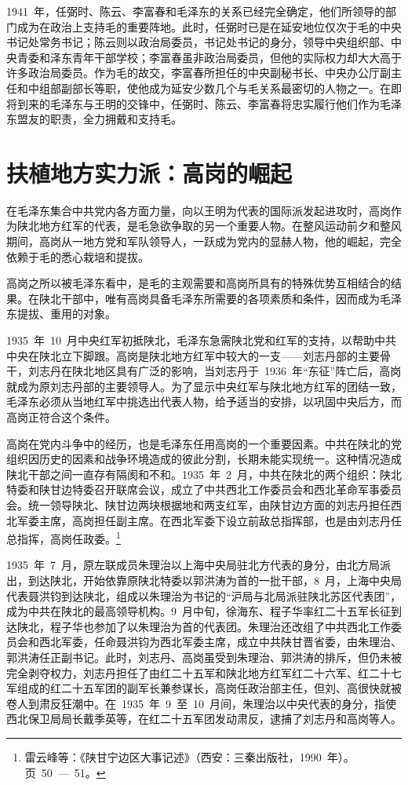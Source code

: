 1941~年，任弼时、陈云、李富春和毛泽东的关系已经完全确定，他们所领导的部门成为在政治上支持毛的重要阵地。此时，任弼时已是在延安地位仅次于毛的中央书记处常务书记；陈云则以政治局委员，书记处书记的身分，领导中央组织部、中央青委和泽东青年干部学校；李富春虽非政治局委员，但他的实际权力却大大高于许多政治局委员。作为毛的故交，李富春所担任的中央副秘书长、中央办公厅副主任和中组部副部长等职，使他成为延安少数几个与毛关系最密切的人物之一。在即将到来的毛泽东与王明的交锋中，任弼时、陈云、李富春将忠实履行他们作为毛泽东盟友的职责，全力拥戴和支持毛。

\section{扶植地方实力派：高岗的崛起}

在毛泽东集合中共党内各方面力量，向以王明为代表的国际派发起进攻时，高岗作为陕北地方红军的代表，是毛急欲争取的另一个重要人物。在整风运动前夕和整风期间，高岗从一地方党和军队领导人，一跃成为党内的显赫人物，他的崛起，完全依赖于毛的悉心栽培和提拔。

高岗之所以被毛泽东看中，是毛的主观需要和高岗所具有的特殊优势互相结合的结果。在陕北干部中，唯有高岗具备毛泽东所需要的各项素质和条件，因而成为毛泽东提拔、重用的对象。

1935~年~10~月中央红军初抵陕北，毛泽东急需陕北党和红军的支持，以帮助中共中央在陕北立下脚跟。高岗是陕北地方红军中较大的一支——刘志丹部的主要骨干，刘志丹在陕北地区具有广泛的影响，当刘志丹于~1936~年“东征”阵亡后，高岗就成为原刘志丹部的主要领导人。为了显示中央红军与陕北地方红军的团结一致，毛泽东必须从当地红军中挑选出代表人物，给予适当的安排，以巩固中央后方，而高岗正符合这个条件。

高岗在党内斗争中的经历，也是毛泽东任用高岗的一个重要因素。中共在陕北的党组织因历史的因素和战争环境造成的彼此分割，长期未能实现统一。这种情况造成陕北干部之间一直存有隔阂和不和。1935~年~2~月，中共在陕北的两个组织：陕北特委和陕甘边特委召开联席会议，成立了中共西北工作委员会和西北革命军事委员会。统一领导陕北、陕甘边两块根据地和两支红军，由陕甘边方面的刘志丹担任西北军委主席，高岗担任副主席。在西北军委下设立前敌总指挥部，也是由刘志丹任总指挥，高岗任政委。\footnote{雷云峰等：《陕甘宁边区大事记述》（西安：三秦出版社，1990~年）。页~50~—~51。}

1935~年~7~月，原左联成员朱理治以上海中央局驻北方代表的身分，由北方局派出，到达陕北，开始依靠原陕北特委以郭洪涛为首的一批干部，8~月，上海中央局代表聂洪钧到达陕北，组成以朱理治为书记的“沪局与北局派驻陕北苏区代表团”，成为中共在陕北的最高领导机构。9~月中旬，徐海东、程子华率红二十五军长征到达陕北，程子华也参加了以朱理治为首的代表团。朱理治还改组了中共西北工作委员会和西北军委，任命聂洪钧为西北军委主席，成立中共陕甘晋省委，由朱理治、郭洪涛任正副书记。此时，刘志丹、高岗虽受到朱理治、郭洪涛的排斥，但仍未被完全剥夺权力，刘志丹担任了由红二十五军和陕北地方红军红二十六军、红二十七军组成的红二十五军团的副军长兼参谋长，高岗任政治部主任，但刘、高很快就被卷人到肃反狂潮中。在~1935~年~9~至~10~月间，朱理治以中央代表的身分，指使西北保卫局局长戴季英等，在红二十五军团发动肃反，逮捕了刘志丹和高岗等人。

